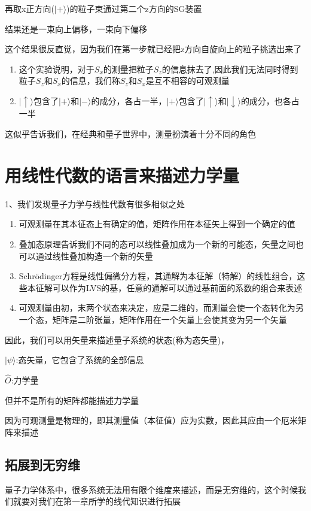 \documentclass[lang=cn,10pt]{elegantbook}
\begin{document}
再取x正方向($|+ \rangle $)的粒子束通过第二个z方向的SG装置

结果还是一束向上偏移，一束向下偏移

这个结果很反直觉，因为我们在第一步就已经把z方向自旋向上的粒子挑选出来了

\begin{enumerate}
	\item  这个实验说明，对于$S_x$的测量把粒子$S_z$的信息抹去了,因此我们无法同时得到粒子$S_z$和$S_x$的信息，我们称$S_z$和$S_x$是互不相容的可观测量
	\item  $|\uparrow \rangle $包含了$|+ \rangle $和$|- \rangle $的成分，各占一半，$|+ \rangle $包含了$|\uparrow \rangle $和$|\downarrow \rangle $的成分，也各占一半
\end{enumerate}
这似乎告诉我们，在经典和量子世界中，测量扮演着十分不同的角色

\section{用线性代数的语言来描述力学量}
1、我们发现量子力学与线性代数有很多相似之处

\begin{enumerate}
	\item 可观测量在其本征态上有确定的值，矩阵作用在本征矢上得到一个确定的值
	\item 叠加态原理告诉我们不同的态可以线性叠加成为一个新的可能态，矢量之间也可以通过线性叠加构造一个新的矢量
	\item Schrödinger方程是线性偏微分方程，其通解为本征解（特解）的线性组合，这些本征解可以作为LVS的基，任意的通解可以通过基前面的系数的组合来表述
	\item 可观测量由初，末两个状态来决定，应是二维的，而测量会使一个态转化为另一个态，矩阵是二阶张量，矩阵作用在一个矢量上会使其变为另一个矢量
\end{enumerate}
因此，我们可以用矢量来描述量子系统的状态(称为态矢量)，

$|\psi \rangle $:态矢量，它包含了系统的全部信息

$\hat{O}$:力学量

但并不是所有的矩阵都能描述力学量

因为可观测量是物理的，即其测量值（本征值）应为实数，因此其应由一个厄米矩阵来描述
\subsection{拓展到无穷维}

量子力学体系中，很多系统无法用有限个维度来描述，而是无穷维的，这个时候我们就要对我们在第一章所学的线代知识进行拓展
\end{document}
